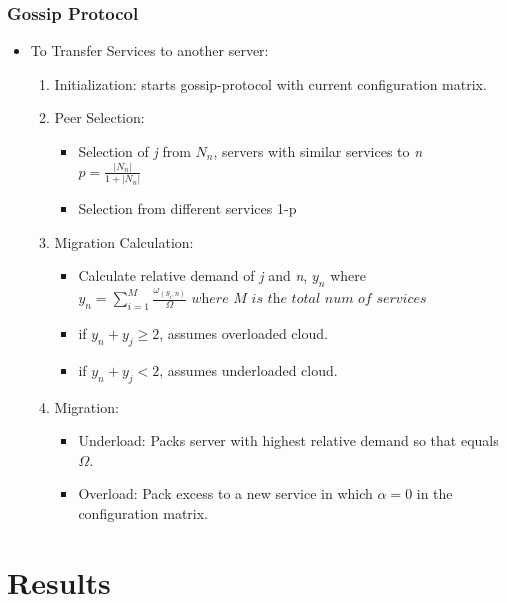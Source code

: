 \documentclass{beamer}
\begin{document}
\begin{frame}
	\frametitle{Gossip Protocol}
	\begin{itemize}
		\item To Transfer Services to another server:
			\begin{enumerate}
				\item Initialization: starts gossip-protocol with current configuration matrix.
				\item Peer Selection: 
					\begin{itemize}
						\item Selection of \emph{j} from $N_n$, servers with similar services to \emph{n}\\
					$p = \frac{|N_{n}|}{1+|N_{n}|}$
						
						\item Selection from different services 1-p
					\end{itemize}
					
				\item Migration Calculation:
				\begin{itemize}
				\item Calculate relative demand of \emph{j} and \emph{n}, $y_n$ where \\
				$y_n = \sum_{i=1}^M \frac{\omega_{(S_i,n)}}{\Omega} \textit{~where M is the total num of services}$
				\item if $y_n+y_j \geq 2$, assumes overloaded cloud.
				\item if $y_n+y_j < 2$, assumes underloaded cloud.
				
				\end{itemize}
				\item Migration:
				\begin{itemize}
				\item Underload: Packs server with highest relative demand so that equals $\Omega$.
				\item Overload: Pack excess to a new service in which $\alpha = 0$ in the configuration matrix. 
				
				\end{itemize}
			\end{enumerate} 
	\end{itemize}
\end{frame}


\section[Results]{Results}
\end{document}
